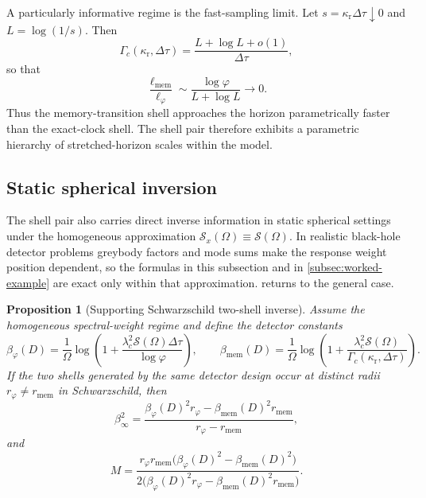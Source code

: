 \documentclass[11pt]{article}
\newtheorem{proposition}[theorem]{Proposition}
\theoremstyle{definition}
\begin{document}
A particularly informative regime is the fast-sampling limit. Let $s=\kappa_{\mathrm r}\Delta\tau\downarrow0$ and $L=\log(1/s)$. Then
\begin{equation}\label{eq:fast-sampling-main}
\Gamma_c(\kappa_{\mathrm r},\Delta\tau)
=
\frac{L+\log L+o(1)}{\Delta\tau},
\end{equation}
so that
\begin{equation}\label{eq:fast-ratio-main}
\frac{\ell_{\mathrm{mem}}}{\ell_{\varphi}}
\sim
\frac{\log\varphi}{L+\log L}
\longrightarrow0.
\end{equation}
Thus the memory-transition shell approaches the horizon parametrically faster than the exact-clock shell. The shell pair therefore exhibits a parametric hierarchy of stretched-horizon scales within the model.

\subsection{Static spherical inversion}

The shell pair also carries direct inverse information in static spherical settings under the homogeneous approximation $\mathcal S_x(\Omega)\equiv\mathcal S(\Omega)$. In realistic black-hole detector problems greybody factors and mode sums make the response weight position dependent, so the formulas in this subsection and in \cref{subsec:worked-example} are exact only within that approximation.  returns to the general case.

\begin{proposition}[Supporting Schwarzschild two-shell inverse]\label{prop:schw-main}
Assume the homogeneous spectral-weight regime and define the detector constants
\begin{equation}\label{eq:beta-constants-main}
\beta_{\varphi}(D)=
\frac{1}{\Omega}
\log\!\left(1+\frac{\lambda_c^2\mathcal S(\Omega)\Delta\tau}{\log\varphi}\right),
\qquad
\beta_{\mathrm{mem}}(D)=
\frac{1}{\Omega}
\log\!\left(1+\frac{\lambda_c^2\mathcal S(\Omega)}
{\Gamma_c(\kappa_{\mathrm r},\Delta\tau)}\right).
\end{equation}
If the two shells generated by the same detector design occur at distinct radii $r_{\varphi}\neq r_{\mathrm{mem}}$ in Schwarzschild, then
\begin{equation}\label{eq:beta-infty-main}
\beta_\infty^2=
\frac{\beta_{\varphi}(D)^2r_{\varphi}-\beta_{\mathrm{mem}}(D)^2r_{\mathrm{mem}}}
{r_{\varphi}-r_{\mathrm{mem}}},
\end{equation}
and
\begin{equation}\label{eq:mass-main}
M=
\frac{r_{\varphi}r_{\mathrm{mem}}\bigl(\beta_{\varphi}(D)^2-\beta_{\mathrm{mem}}(D)^2\bigr)}
{2\bigl(\beta_{\varphi}(D)^2r_{\varphi}-\beta_{\mathrm{mem}}(D)^2r_{\mathrm{mem}}\bigr)}.
\end{equation}
\end{proposition}
\end{document}
